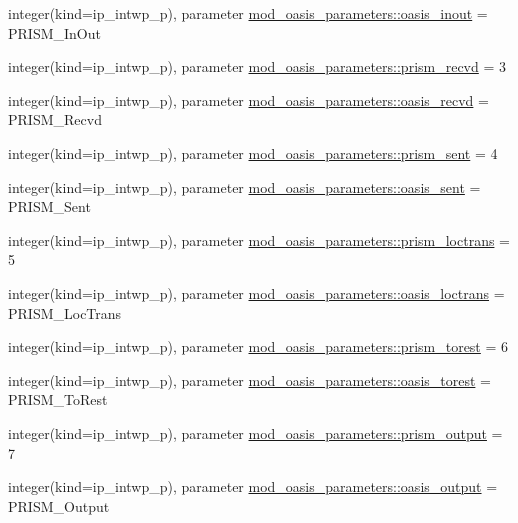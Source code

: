 \begin{DoxyCompactItemize}
\item 
integer(kind=ip\+\_\+intwp\+\_\+p), parameter \hyperlink{namespacemod__oasis__parameters_adc22f0871027f573ac705ca4593519f0}{mod\+\_\+oasis\+\_\+parameters\+::oasis\+\_\+inout} = P\+R\+I\+S\+M\+\_\+\+In\+Out
\item 
integer(kind=ip\+\_\+intwp\+\_\+p), parameter \hyperlink{namespacemod__oasis__parameters_aa0bc3b208a1f962e5ec08916b36cae2d}{mod\+\_\+oasis\+\_\+parameters\+::prism\+\_\+recvd} = 3
\item 
integer(kind=ip\+\_\+intwp\+\_\+p), parameter \hyperlink{namespacemod__oasis__parameters_a50fc92036d81ca0ea23918e1feddfe75}{mod\+\_\+oasis\+\_\+parameters\+::oasis\+\_\+recvd} = P\+R\+I\+S\+M\+\_\+\+Recvd
\item 
integer(kind=ip\+\_\+intwp\+\_\+p), parameter \hyperlink{namespacemod__oasis__parameters_a403c181a893e178ee0ad6ec6f8d26c9c}{mod\+\_\+oasis\+\_\+parameters\+::prism\+\_\+sent} = 4
\item 
integer(kind=ip\+\_\+intwp\+\_\+p), parameter \hyperlink{namespacemod__oasis__parameters_af739945ec2da833423cdc6e220e1c847}{mod\+\_\+oasis\+\_\+parameters\+::oasis\+\_\+sent} = P\+R\+I\+S\+M\+\_\+\+Sent
\item 
integer(kind=ip\+\_\+intwp\+\_\+p), parameter \hyperlink{namespacemod__oasis__parameters_af9dc530c2cf2f0e5b5bb04fecb8373dd}{mod\+\_\+oasis\+\_\+parameters\+::prism\+\_\+loctrans} = 5
\item 
integer(kind=ip\+\_\+intwp\+\_\+p), parameter \hyperlink{namespacemod__oasis__parameters_a8b206cc178182e3526d400ea7a6587b5}{mod\+\_\+oasis\+\_\+parameters\+::oasis\+\_\+loctrans} = P\+R\+I\+S\+M\+\_\+\+Loc\+Trans
\item 
integer(kind=ip\+\_\+intwp\+\_\+p), parameter \hyperlink{namespacemod__oasis__parameters_a8d037fafc163f46260a8704f92a885a1}{mod\+\_\+oasis\+\_\+parameters\+::prism\+\_\+torest} = 6
\item 
integer(kind=ip\+\_\+intwp\+\_\+p), parameter \hyperlink{namespacemod__oasis__parameters_a875abcc1cc679cb72f20d42d3dbfac97}{mod\+\_\+oasis\+\_\+parameters\+::oasis\+\_\+torest} = P\+R\+I\+S\+M\+\_\+\+To\+Rest
\item 
integer(kind=ip\+\_\+intwp\+\_\+p), parameter \hyperlink{namespacemod__oasis__parameters_adc510873316710fd71696fabcc34f336}{mod\+\_\+oasis\+\_\+parameters\+::prism\+\_\+output} = 7
\item 
integer(kind=ip\+\_\+intwp\+\_\+p), parameter \hyperlink{namespacemod__oasis__parameters_a7f9f81f3b1f2c8b09a460aeca27ea859}{mod\+\_\+oasis\+\_\+parameters\+::oasis\+\_\+output} = P\+R\+I\+S\+M\+\_\+\+Output

\end{DoxyCompactItemize}
